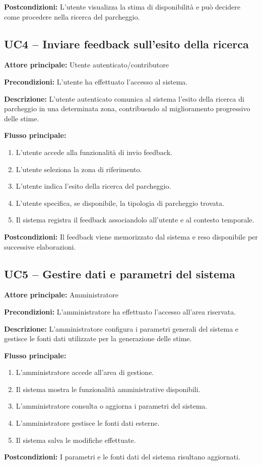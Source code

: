 \documentclass[a4paper,12pt]{article}
\begin{document}
\textbf{Postcondizioni:} L'utente visualizza la stima di disponibilità e può decidere come procedere nella ricerca del parcheggio.
\subsection*{UC4 -- Inviare feedback sull'esito della ricerca}

\textbf{Attore principale:} Utente autenticato/contributore

\textbf{Precondizioni:} L'utente ha effettuato l'accesso al sistema.

\textbf{Descrizione:}  
L'utente autenticato comunica al sistema l'esito della ricerca di parcheggio in una determinata zona, contribuendo al miglioramento progressivo delle stime.

\textbf{Flusso principale:}
\begin{enumerate}
    \item L'utente accede alla funzionalità di invio feedback.
    \item L'utente seleziona la zona di riferimento.
    \item L'utente indica l'esito della ricerca del parcheggio.
    \item L'utente specifica, se disponibile, la tipologia di parcheggio trovata.
    \item Il sistema registra il feedback associandolo all'utente e al contesto temporale.
\end{enumerate}

\textbf{Postcondizioni:} Il feedback viene memorizzato dal sistema e reso disponibile per successive elaborazioni.
\subsection*{UC5 -- Gestire dati e parametri del sistema}

\textbf{Attore principale:} Amministratore

\textbf{Precondizioni:} L'amministratore ha effettuato l'accesso all'area riservata.

\textbf{Descrizione:}  
L'amministratore configura i parametri generali del sistema e gestisce le fonti dati utilizzate per la generazione delle stime.

\textbf{Flusso principale:}
\begin{enumerate}
    \item L'amministratore accede all'area di gestione.
    \item Il sistema mostra le funzionalità amministrative disponibili.
    \item L'amministratore consulta o aggiorna i parametri del sistema.
    \item L'amministratore gestisce le fonti dati esterne.
    \item Il sistema salva le modifiche effettuate.
\end{enumerate}

\textbf{Postcondizioni:} I parametri e le fonti dati del sistema risultano aggiornati.
\end{document}
